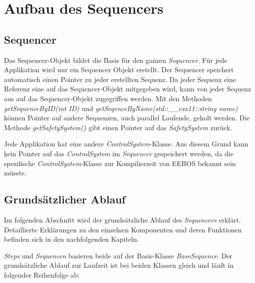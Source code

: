 \chapter{Aufbau des Sequencers}
\label{sequencerAufbau}
\section{Sequencer}
Das Sequencer-Objekt bildet die Basis für den ganzen \textit{Sequencer}.
Für jede Applikation wird nur ein Sequencer Objekt erstellt.
Der Sequencer speichert automatisch einen Pointer zu jeder erstellten Sequenz.
Da jeder Sequenz eine Referenz eine auf das Sequencer-Objekt mitgegeben wird, kann von jeder Sequenz aus auf das Sequencer-Objekt zugegriffen werden.
Mit den Methoden \textit{getSequenceByID(int ID)} und \textit{getSeqenceByName(std::\_\_cxx11::string name)} können Pointer auf andere Sequenzen, auch parallel Laufende, geholt werden.
Die Methode \textit{getSafetySystem()} gibt einen Pointer auf das \textit{SafetySystem} zurück.

Jede Applikation hat eine andere \textit{ControlSystem}-Klasse.
Aus diesem Grund kann kein Pointer auf das \textit{ControlSystem} im \textit{Sequencer} gespeichert werden, da die spezifische \textit{ControlSystem}-Klasse zur Kompilierzeit von EEROS bekannt sein müsste.



\section{Grundsätzlicher Ablauf}
Im folgenden Abschnitt wird der grundsätzliche Ablauf des \textit{Sequencers} erklärt.
Detaillierte Erklärungen zu den einzelnen Komponenten und deren Funktionen befinden sich in den nachfolgenden Kapiteln.

\textit{Steps} und \textit{Sequencen} basieren beide auf der Basis-Klasse \textit{BaseSequence}.
Der grundsätzliche Ablauf zur Laufzeit ist bei beiden Klassen gleich und läuft in folgender Reihenfolge ab:


